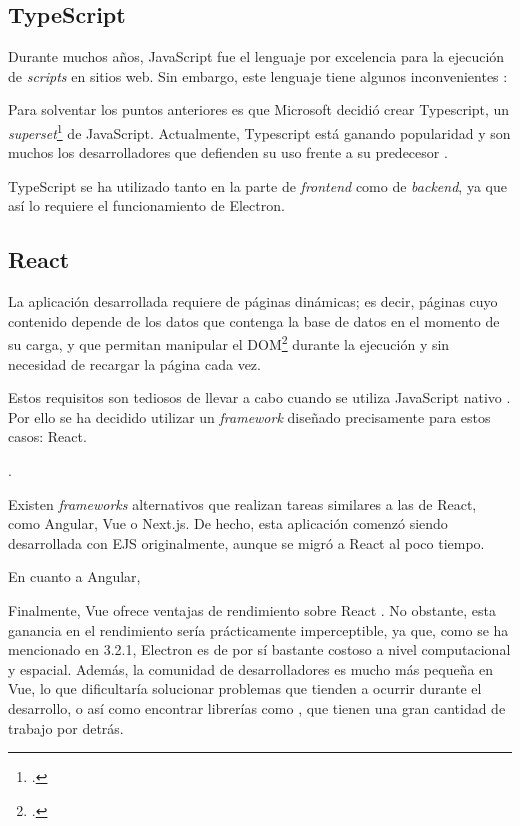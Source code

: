 \subsection{TypeScript}

Durante muchos años, JavaScript fue el lenguaje por excelencia para la ejecución de \textit{scripts} en sitios web. Sin embargo, este lenguaje tiene algunos inconvenientes \autocite{10.1007/978-3-662-44202-9_11}: \todo

Para solventar los puntos anteriores es que Microsoft decidió crear Typescript, un \textit{superset}\footnote{.} de JavaScript. Actualmente, Typescript está ganando popularidad y son muchos los desarrolladores que defienden su uso frente a su predecesor \autocite{Typescript}.

TypeScript se ha utilizado tanto en la parte de \textit{frontend} como de \textit{backend}, ya que así lo requiere el funcionamiento de Electron.

\subsection{React}

La aplicación desarrollada requiere de páginas dinámicas; es decir, páginas cuyo contenido depende de los datos que contenga la base de datos en el momento de su carga, y que permitan manipular el DOM\footnote{.} durante la ejecución y sin necesidad de recargar la página cada vez.

Estos requisitos son tediosos de llevar a cabo cuando se utiliza JavaScript nativo \citationNeeded. Por ello se ha decidido utilizar un \textit{framework} diseñado precisamente para estos casos: React.

.

Existen \textit{frameworks} alternativos que realizan tareas similares a las de React, como Angular, Vue o Next.js. De hecho, esta aplicación comenzó siendo desarrollada con EJS originalmente, aunque se migró a React al poco tiempo.

En cuanto a Angular,

Finalmente, Vue ofrece ventajas de rendimiento sobre React \autocite{Comparison}. No obstante, esta ganancia en el rendimiento sería prácticamente imperceptible, ya que, como se ha mencionado en 3.2.1, Electron es de por sí bastante costoso a nivel computacional y espacial. Además, la comunidad de desarrolladores es mucho más pequeña en Vue, lo que dificultaría solucionar problemas que tienden a ocurrir durante el desarrollo, o así como encontrar librerías como , que tienen una gran cantidad de trabajo por detrás.

